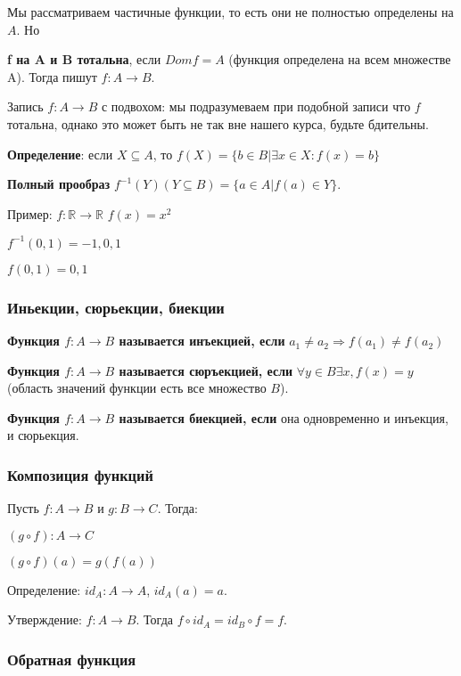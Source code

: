 \documentclass[openany]{article}
\newcommand{\R} {\mathbb{R}}
\begin{document}
   Мы рассматриваем частичные функции, то есть они не полностью определены на $A$. Но

   \textbf{f на A и B тотальна}, если $Dom f = A$ (функция определена на всем множестве A). Тогда пишут $f: A \rightarrow B$.

   Запись $f: A \rightarrow B$ с подвохом: мы подразумеваем при подобной записи что $f$ тотальна, однако это может быть не так вне нашего курса, будьте бдительны.

   \textbf{Определение}: если $X \subseteq A$, то $f(X) = \{b \in B| \exists x \in X: f(x) = b\}$

   \textbf{Полный прообраз} $f^{-1}(Y) (Y \subseteq B) = \{a \in A| f(a) \in Y\}$.

   Пример: $f: \R \rightarrow \R$ $f(x) = x^2$

   $f^{-1}({0, 1}) = {-1, 0, 1}$

   $f({0, 1}) = {0, 1}$

   \subsubsection{Иньекции, сюрьекции, биекции}

   \textbf{Функция $f: A \rightarrow B$ называется инъекцией, если} $a_1 \neq a_2 \Rightarrow f(a_1) \neq f(a_2)$

   \textbf{Функция $f: A \rightarrow B$ называется сюръекцией, если} $\forall y \in B \exists x, f(x) = y$ (область значений функции есть все множество $B$).

   \textbf{Функция $f: A \rightarrow B$ называется биекцией, если} она одновременно и инъекция, и сюрьекция.

   \subsubsection{Композиция функций}

   Пусть $f: A \rightarrow B$ и $g: B \rightarrow C$. Тогда:

   $(g \circ f): A \rightarrow C$

   $(g \circ f)(a) = g(f(a))$

   Определение: $id_A: A \rightarrow A$, $id_A(a) = a$.

   Утверждение: $f: A \rightarrow B$. Тогда $f \circ id_A = id_B \circ f = f$.

   \subsubsection{Обратная функция}
\end{document}
